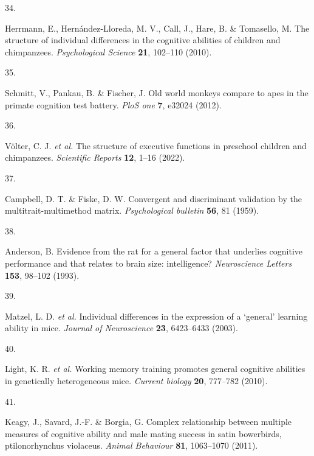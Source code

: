 \documentclass[
  man,floatsintext]{apa6}
\newlength{\cslhangindent}
\newlength{\csllabelwidth}
\newlength{\cslentryspacingunit} %
\newenvironment{CSLReferences}[2] %
 {%
  \setlength{\parindent}{0pt}
  \ifodd #1
  \let\oldpar\par
  \def\par{\hangindent=\cslhangindent\oldpar}
  \fi
  \setlength{\parskip}{#2\cslentryspacingunit}
 }%
 {}
\newcommand{\CSLLeftMargin}[1]{\parbox[t]{\csllabelwidth}{#1}}
\newcommand{\CSLRightInline}[1]{\parbox[t]{\linewidth - \csllabelwidth}{#1}\break}
\begin{document}
\begin{CSLReferences}{0}{0}
\leavevmode{}%
\CSLLeftMargin{34. }%
\CSLRightInline{Herrmann, E., Hernández-Lloreda, M. V., Call, J., Hare, B. \& Tomasello, M. The structure of individual differences in the cognitive abilities of children and chimpanzees. \emph{Psychological Science} \textbf{21}, 102--110 (2010).}

\leavevmode{}%
\CSLLeftMargin{35. }%
\CSLRightInline{Schmitt, V., Pankau, B. \& Fischer, J. Old world monkeys compare to apes in the primate cognition test battery. \emph{PloS one} \textbf{7}, e32024 (2012).}

\leavevmode{}%
\CSLLeftMargin{36. }%
\CSLRightInline{Völter, C. J. \emph{et al.} The structure of executive functions in preschool children and chimpanzees. \emph{Scientific Reports} \textbf{12}, 1--16 (2022).}

\leavevmode{}%
\CSLLeftMargin{37. }%
\CSLRightInline{Campbell, D. T. \& Fiske, D. W. Convergent and discriminant validation by the multitrait-multimethod matrix. \emph{Psychological bulletin} \textbf{56}, 81 (1959).}

\leavevmode{}%
\CSLLeftMargin{38. }%
\CSLRightInline{Anderson, B. Evidence from the rat for a general factor that underlies cognitive performance and that relates to brain size: intelligence? \emph{Neuroscience Letters} \textbf{153}, 98--102 (1993).}

\leavevmode{}%
\CSLLeftMargin{39. }%
\CSLRightInline{Matzel, L. D. \emph{et al.} Individual differences in the expression of a {`general'} learning ability in mice. \emph{Journal of Neuroscience} \textbf{23}, 6423--6433 (2003).}

\leavevmode{}%
\CSLLeftMargin{40. }%
\CSLRightInline{Light, K. R. \emph{et al.} Working memory training promotes general cognitive abilities in genetically heterogeneous mice. \emph{Current biology} \textbf{20}, 777--782 (2010).}

\leavevmode{}%
\CSLLeftMargin{41. }%
\CSLRightInline{Keagy, J., Savard, J.-F. \& Borgia, G. Complex relationship between multiple measures of cognitive ability and male mating success in satin bowerbirds, ptilonorhynchus violaceus. \emph{Animal Behaviour} \textbf{81}, 1063--1070 (2011).}


\end{CSLReferences}
\end{document}
